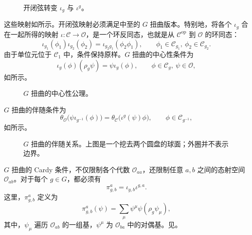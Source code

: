 \begin{figure}[H]
\centering
{}
\caption{开闭弦转变 $\iota_g$ 与 $\iota^g$。}\label{fig:2.27}
\end{figure}

这些映射如所示。开闭弦映射必须满足中至的 $G$ 扭曲版本。特别地，将各个 $\iota_g$ 合在一起所得的映射 $\iota\colon\mathcal{C}\to\mathcal{O}$，是一个环反同态，也就是从 $\mathcal{C}^{\mathrm{op}}$ 到 $\mathcal{O}$ 的环同态：
\begin{equation}\label{eq:2.102}
\iota_{g_1}(\phi_1)\iota_{g_2}(\phi_2)
=\iota_{g_2g_1}(\phi_2\phi_1),
\qquad\phi_1\in\mathcal{C}_{g_1},\ \phi_2\in\mathcal{C}_{g_2}.
\end{equation}
由于单位元位于 $\mathcal{C}_1$ 中，条件保持原样。$G$ 扭曲的中心性条件为
\begin{equation}\label{eq:2.103}
\iota_g(\phi)(\rho_g\psi)=\psi\iota_g(\phi),
\qquad\phi\in\mathcal{C}_g,\ \psi\in\mathcal{O},
\end{equation}
如所示。

\begin{figure}[H]
\centering
{}
\caption{$G$ 扭曲的中心性公理。}\label{fig:2.28}
\end{figure}

$G$ 扭曲的伴随条件为
\begin{equation}\label{eq:2.104}
\theta_{\mathcal{O}}\bigl(\psi\iota_{g^{-1}}(\phi)\bigr)
=\theta_{\mathcal{C}}\bigl(\iota^g(\psi)\phi\bigr),
\qquad\phi\in\mathcal{C}_{g^{-1}},
\end{equation}
如所示。

\begin{figure}[H]
\centering
{}
\caption{$G$ 扭曲的伴随关系。上图是一个挖去两个圆盘的球面；外圈并不表示边界。}\label{fig:2.29}
\end{figure}

$G$ 扭曲的 Cardy 条件，不仅限制各个代数 $\mathcal{O}_{aa}$，还限制任意 $a,b$ 之间的态射空间 $\mathcal{O}_{ab}$。对于每个 $g\in G$，都必须有
\begin{equation}\label{eq:2.105}
\pi_{g,b}^a=\iota_{g,b}\iota^{g,a}.
\end{equation}
这里，$\pi_{g,b}^a$ 定义为
\begin{equation}\label{eq:2.106}
\pi_{g,b}^a(\psi)=\sum_\mu\psi^\mu\psi(\rho_g\psi_\mu),
\end{equation}
其中，$\psi_\mu$ 遍历 $\mathcal{O}_{ab}$ 的一组基，$\psi^\mu$ 为 $\mathcal{O}_{ba}$ 中的对偶基。见。



